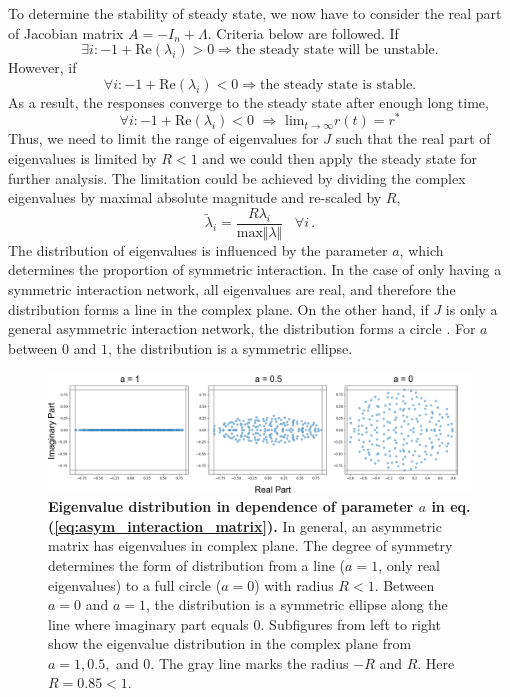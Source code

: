 \documentclass[11pt]{article}
\begin{document}
{	To determine the stability of steady state, we now have to consider the real part of Jacobian matrix $A =-I_n + \Lambda$. 
	Criteria below are followed. If
		\begin{equation*}
			\exists i: -1 + \text{Re}(\lambda_i) > 0 \Rightarrow \text{the steady state will be unstable.}
		\end{equation*}
	However, if 
		\begin{equation*}
			\forall i: -1 + \text{Re}(\lambda_i) < 0 \Rightarrow \text{the steady state is stable.}
		\end{equation*}
	As a result, the responses converge to the steady state after enough long time, 
		\begin{equation} \label{eq:asym_stable_fix_point}
			\forall i: -1 + \text{Re}(\lambda_i) < 0 \, \,  \Rightarrow \, \, \text{lim}_{t \rightarrow \infty} r(t) = r^*
		\end{equation}
	Thus, we need to limit the range of eigenvalues for $J$ such that the real part of eigenvalues is limited by $R < 1$ and we could then apply the steady state for further analysis. The limitation could be achieved by dividing the complex eigenvalues by maximal absolute magnitude and re-scaled by $R$, 
		\begin{equation} \label{eq:asym_normalization}
			\tilde{\lambda}_i = \frac{R \lambda_i}{\text{max}\Vert\lambda\Vert} \, \, \, \, \, \forall i \, .
		\end{equation}  
	The distribution of eigenvalues is influenced by the parameter $a$, which determines the proportion of symmetric interaction. In the case of only having a symmetric interaction network, all eigenvalues are real, and therefore the distribution forms a line in the complex plane. On the other hand, if $J$ is only a general asymmetric interaction network, the distribution forms a circle \cite{rajan2006eigenvalue}. For $a$ between $0$ and $1$, the distribution is a symmetric ellipse. 
		\begin{figure} [H]
			\centering
			\includegraphics[width=\textwidth]{../figures/asym_eigval_distribution.pdf}
			\caption{\textbf{Eigenvalue distribution in dependence of parameter $a$ in eq.(\ref{eq:asym_interaction_matrix}).} In general, an asymmetric matrix has eigenvalues in complex plane. The degree of symmetry determines the form of distribution from a line ($a = 1$, only real eigenvalues) to a full circle ($a = 0$) with radius $R < 1$. Between $a = 0$ and $a = 1$, the distribution is a symmetric ellipse along the line where imaginary part equals $0$. Subfigures from left to right show the eigenvalue distribution in the complex plane from $a = 1, 0.5,$ and $0$. The gray line marks the radius $-R$ and $R$. Here $R = 0.85 < 1$.}
		\end{figure}
	
}
\end{document}

